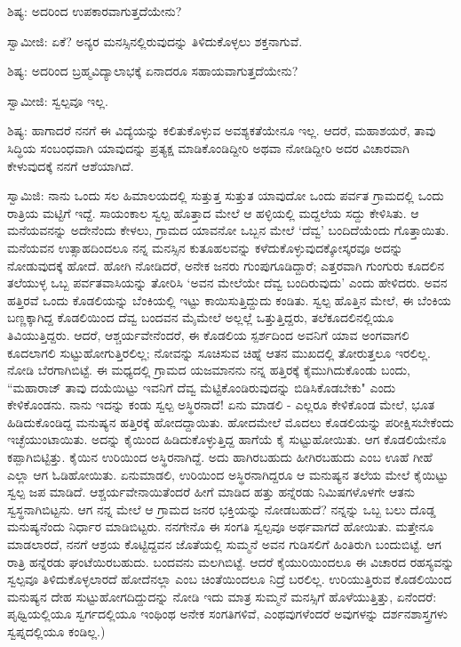 ಶಿಷ್ಯ: ಅದರಿಂದ ಉಪಕಾರವಾಗುತ್ತದೆಯೇನು?

ಸ್ವಾಮೀಜಿ: ಏಕೆ? ಅನ್ಯರ ಮನಸ್ಸಿನಲ್ಲಿರುವುದನ್ನು ತಿಳಿದುಕೊಳ್ಳಲು ಶಕ್ತನಾಗುವೆ.

ಶಿಷ್ಯ: ಅದರಿಂದ ಬ್ರಹ್ಮವಿದ್ಯಾಲಾಭಕ್ಕೆ ಏನಾದರೂ ಸಹಾಯವಾಗುತ್ತದೆಯೇನು?

ಸ್ವಾಮೀಜಿ: ಸ್ವಲ್ಪವೂ ಇಲ್ಲ.

ಶಿಷ್ಯ: ಹಾಗಾದರೆ ನನಗೆ ಈ ವಿದ್ಯೆಯನ್ನು ಕಲಿತುಕೊಳ್ಳುವ ಅವಶ್ಯಕತೆಯೇನೂ ಇಲ್ಲ. ಆದರೆ, ಮಹಾಶಯರೆ, ತಾವು ಸಿದ್ಧಿಯ ಸಂಬಂಧವಾಗಿ ಯಾವುದನ್ನು ಪ್ರತ್ಯಕ್ಷ ಮಾಡಿಕೊಂಡಿದ್ದೀರಿ ಅಥವಾ ನೋಡಿದ್ದೀರಿ ಅದರ ವಿಚಾರವಾಗಿ ಕೇಳುವುದಕ್ಕೆ ನನಗೆ ಆಶೆಯಾಗಿದೆ.

ಸ್ವಾಮಿಜಿ: ನಾನು ಒಂದು ಸಲ ಹಿಮಾಲಯದಲ್ಲಿ ಸುತ್ತುತ್ತ ಸುತ್ತುತ ಯಾವುದೋ ಒಂದು ಪರ್ವತ ಗ್ರಾಮದಲ್ಲಿ ಒಂದು ರಾತ್ರಿಯ ಮಟ್ಟಿಗೆ ಇದ್ದೆ. ಸಾಯಂಕಾಲ ಸ್ವಲ್ಪ ಹೊತ್ತಾದ ಮೇಲೆ ಆ ಹಳ್ಳಿಯಲ್ಲಿ ಮದ್ದಲೆಯ ಸದ್ದು ಕೇಳಿಸಿತು. ಆ ಮನೆಯವನನ್ನು ಅದೇನೆಂದು ಕೇಳಲು, ಗ್ರಾಮದ ಯಾವನೋ ಒಬ್ಬನ ಮೇಲೆ ‘ದೆವ್ವ’ ಬಂದಿದೆಯೆಂದು ಗೊತ್ತಾಯಿತು. ಮನೆಯವನ ಉತ್ಸಾಹದಿಂದಲೂ ನನ್ನ ಮನಸ್ಸಿನ ಕುತೂಹಲವನ್ನು ಕಳೆದುಕೊಳ್ಳುವುದಕ್ಕೋಸ್ಕರವೂ ಅದನ್ನು ನೋಡುವುದಕ್ಕೆ ಹೋದೆ. ಹೋಗಿ ನೋಡಿದರೆ, ಅನೇಕ ಜನರು ಗುಂಪುಗೂಡಿದ್ದಾರೆ; ಎತ್ತರವಾಗಿ ಗುಂಗುರು ಕೂದಲಿನ ತಲೆಯುಳ್ಳ ಒಬ್ಬ ಪರ್ವತವಾಸಿಯನ್ನು ತೋರಿಸಿ ‘ಅವನ ಮೇಲೆಯೇ ದೆವ್ವ ಬಂದಿರುವುದು’ ಎಂದು ಹೇಳಿದರು. ಅವನ ಹತ್ತಿರವೆ ಒಂದು ಕೊಡಲಿಯನ್ನು ಬೆಂಕಿಯಲ್ಲಿ ಇಟ್ಟು ಕಾಯಿಸುತ್ತಿದ್ದುದು ಕಂಡಿತು. ಸ್ವಲ್ಪ ಹೊತ್ತಿನ ಮೇಲೆ, ಈ ಬೆಂಕಿಯ ಬಣ್ಣಕ್ಕಾಗಿದ್ದ ಕೊಡಲಿಯಿಂದ ದೆವ್ವ ಬಂದವನ ಮೈಮೇಲೆ ಅಲ್ಲಲ್ಲೆ ಒತ್ತುತ್ತಿದ್ದರು, ತಲೆಕೂದಲಿನಲ್ಲಿಯೂ ತಿವಿಯುತ್ತಿದ್ದರು. ಆದರೆ, ಆಶ್ಚರ್ಯವೇನೆಂದರೆ, ಈ ಕೊಡಲಿಯ ಸ್ಪರ್ಶದಿಂದ ಅವನಿಗೆ ಯಾವ ಅಂಗವಾಗಲಿ ಕೂದಲಾಗಲಿ ಸುಟ್ಟುಹೋಗುತ್ತಿರಲಿಲ್ಲ; ನೋವನ್ನು ಸೂಚಿಸುವ ಚಿಹ್ನೆ ಆತನ ಮುಖದಲ್ಲಿ ತೋರುತ್ತಲೂ ಇರಲಿಲ್ಲ. ನೋಡಿ ಬೆರಗಾಗಿಬಿಟ್ಟೆ. ಈ ಮಧ್ಯದಲ್ಲಿ ಗ್ರಾಮದ ಯಜಮಾನನು ನನ್ನ ಹತ್ತಿರಕ್ಕೆ ಕೈಮುಗಿದುಕೊಂಡು ಬಂದು, “ಮಹಾರಾಜ್ ತಾವು ದಯೆಯಿಟ್ಟು ಇವನಿಗೆ ದೆವ್ವ ಮೆಟ್ಟಿಕೊಂಡಿರುವುದನ್ನು ಬಿಡಿಸಿಕೊಡಬೇಕು" ಎಂದು ಕೇಳಿಕೊಂಡನು. ನಾನು ಇದನ್ನು ಕಂಡು ಸ್ವಲ್ಪ ಅಸ್ಥಿರನಾದೆ! ಏನು ಮಾಡಲಿ - ಎಲ್ಲರೂ ಕೇಳಿಕೊಂಡ ಮೇಲೆ, ಭೂತ ಹಿಡಿದುಕೊಂಡಿದ್ದ ಮನುಷ್ಯನ ಹತ್ತಿರಕ್ಕೆ ಹೋದದ್ದಾಯಿತು. ಹೋದಮೇಲೆ ಮೊದಲು ಕೊಡಲಿಯನ್ನು ಪರೀಕ್ಷಿಸಬೇಕೆಂದು ಇಚ್ಛೆಯುಂಟಾಯಿತು. ಅದನ್ನು ಕೈಯಿಂದ ಹಿಡಿದುಕೊಳ್ಳುತ್ತಿದ್ದ ಹಾಗೆಯೆ ಕೈ ಸುಟ್ಟುಹೋಯಿತು. ಆಗ ಕೊಡಲಿಯೇನೊ ಕಪ್ಪಾಗಿಬಿಟ್ಟಿತ್ತು. ಕೈಯಿನ ಉರಿಯಿಂದ ಅಸ್ಥಿರನಾಗಿದ್ದೆ. ಅದು ಹಾಗಿರಬಹುದು ಹೀಗಿರಬಹುದು ಎಂಬ ಊಹೆ ಗೀಹೆ ಎಲ್ಲಾ ಆಗ ಓಡಿಹೋಯಿತು. ಏನುಮಾಡಲಿ, ಉರಿಯಿಂದ ಅಸ್ಥಿರನಾಗಿದ್ದರೂ ಆ ಮನುಷ್ಯನ ತಲೆಯ ಮೇಲೆ ಕೈಯಿಟ್ಟು ಸ್ವಲ್ಪ ಜಪ ಮಾಡಿದೆ. ಆಶ್ಚರ್ಯವೇನಾಯಿತೆಂದರೆ ಹೀಗೆ ಮಾಡಿದ ಹತ್ತು ಹನ್ನೆರಡು ನಿಮಿಷಗಳೊಳಗೇ ಆತನು ಸ್ವಸ್ಥನಾಗಿಬಿಟ್ಟನು. ಆಗ ನನ್ನ ಮೇಲೆ ಆ ಗ್ರಾಮದ ಜನರ ಭಕ್ತಿಯನ್ನು ನೋಡಬಹುದೆ? ನನ್ನನ್ನು ಒಬ್ಬ ಬಲು ದೊಡ್ಡ ಮನುಷ್ಯನೆಂದು ನಿರ್ಧಾರ ಮಾಡಿಬಿಟ್ಟರು. ನನಗೇನೊ ಈ ಸಂಗತಿ ಸ್ವಲ್ಪವೂ ಅರ್ಥವಾಗದೆ ಹೋಯಿತು. ಮತ್ತೇನೂ ಮಾಡಲಾರದೆ, ನನಗೆ ಆಶ್ರಯ ಕೊಟ್ಟಿದ್ದವನ ಜೊತೆಯಲ್ಲಿ ಸುಮ್ಮನೆ ಅವನ ಗುಡಿಸಲಿಗೆ ಹಿಂತಿರುಗಿ ಬಂದುಬಿಟ್ಟೆ. ಆಗ ರಾತ್ರಿ ಹನ್ನೆರಡು ಘಂಟೆಯಿರಬಹುದು. ಬಂದವನು ಮಲಗಿಬಿಟ್ಟೆ. ಆದರೆ ಕೈಯುರಿಯಿಂದಲೂ ಈ ವಿಚಾರದ ರಹಸ್ಯವನ್ನು ಸ್ವಲ್ಪವೂ ತಿಳಿದುಕೊಳ್ಳಲಾರದೆ ಹೋದೆನಲ್ಲಾ ಎಂಬ ಚಿಂತೆಯಿಂದಲೂ ನಿದ್ರೆ ಬರಲಿಲ್ಲ. ಉರಿಯುತ್ತಿರುವ ಕೊಡಲಿಯಿಂದ ಮನುಷ್ಯನ ದೇಹ ಸುಟ್ಟುಹೋಗದಿದ್ದುದನ್ನು ನೋಡಿ ಇದು ಮಾತ್ರ ಸುಮ್ಮನೆ ಮನಸ್ಸಿಗೆ ಹೊಳೆಯುತ್ತಿತ್ತು, ಏನೆಂದರೆ:  ಪೃಥ್ವಿಯಲ್ಲಿಯೂ ಸ್ವರ್ಗದಲ್ಲಿಯೂ ಇಂಥಿಂಥ ಅನೇಕ ಸಂಗತಿಗಳಿವೆ, ಎಂಥವುಗಳೆಂದರೆ ಅವುಗಳನ್ನು ದರ್ಶನಶಾಸ್ತ್ರಗಳು ಸ್ವಪ್ನದಲ್ಲಿಯೂ ಕಂಡಿಲ್ಲ.)


